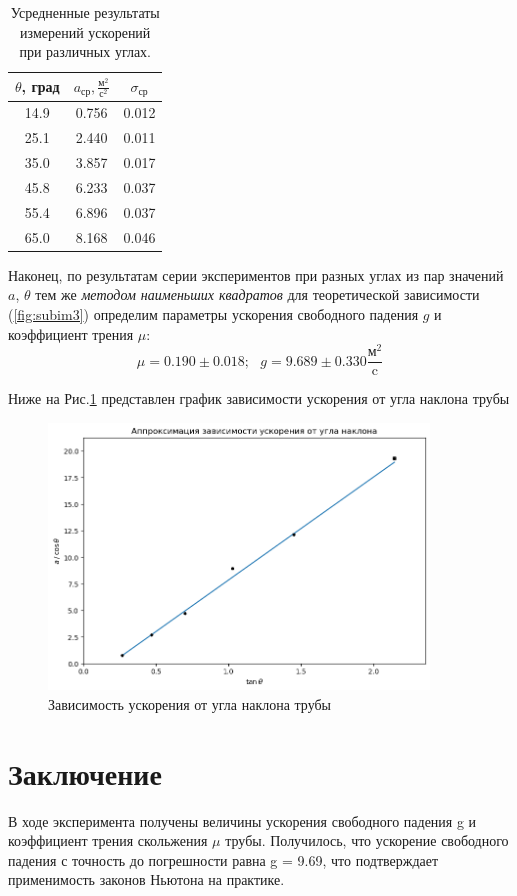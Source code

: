 \documentclass[
	a4paper, %
	12pt, %
]{article}
\begin{document}
	\begin{table}[h]
		\centering
		\begin{tabular}[H]{|c|c|c|}
			\hline
			$\theta$, град & $a_{\text{ср}},\frac{\text{м}^2}{\text{с}^2}$ & $\sigma_{\text{ср}}$  \\
			\hline
			14.9 & 0.756 & 0.012 \\
			\hline
			25.1 & 2.440 & 0.011 \\
			\hline
			35.0 & 3.857 & 0.017 \\
			\hline
			45.8 & 6.233 & 0.037 \\
			\hline
			55.4 & 6.896 & 0.037 \\
			\hline
			65.0 & 8.168 & 0.046 \\
			\hline
		\end{tabular}
		\caption{Усредненные результаты измерений ускорений при различных углах.}
		\label{table:3}
	\end{table}
	
		Наконец, по результатам серии экспериментов при разных углах из пар значений {$a$, $\theta$} тем же \textit{методом наименьших квадратов} для теоретической зависимости (\ref{fig:subim3}) определим параметры ускорения свободного падения $g$ и коэффициент трения $\mu$:
	\begin{equation}
		\mu = 0.190 \pm 0.018; \:\:\: g = 9.689 \pm 0.330 \frac{\text{м}^2}{\text{c}}
	\end{equation}
	
	Ниже на Рис.\ref{graph} представлен график зависимости ускорения от угла наклона трубы
	\begin{figure}[h]
		\includegraphics[width=0.9\textwidth]{graphic.png}
		\caption{Зависимость ускорения от угла наклона трубы}
		\label{graph}
	\end{figure}
	
	
	\section{Заключение}
	В ходе эксперимента получены величины ускорения свободного падения g и коэффициент трения скольжения $\mu$ трубы. Получилось, что ускорение свободного падения с точность до погрешности равна g = 9.69, что подтверждает применимость законов Ньютона на практике.
	
	
\end{document}
